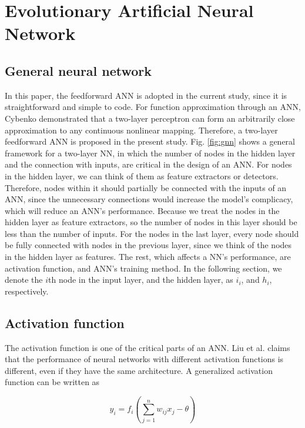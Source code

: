 \section{Evolutionary Artificial Neural Network}

\subsection{General neural network}
In this paper, the feedforward ANN is adopted in the current
study, since it is straightforward and simple to code. For function
approximation through an ANN, Cybenko demonstrated that a two-layer perceptron
can form an arbitrarily close approximation to any continuous nonlinear
mapping\cite{cybenko1989approximation}. Therefore, a two-layer feedforward ANN
is proposed in the present study. Fig. \ref{fig:gnn} shows a general framework for a
two-layer NN, in which the number of nodes in the hidden layer and the
connection with inputs, are critical in the design of an ANN. For nodes in the
hidden layer, we can think of them as feature extractors or detectors.
Therefore, nodes within it should partially be connected with the inputs of an ANN,
since the unnecessary connections would increase the model's complicacy, which
will reduce an ANN’s performance. Because we treat the nodes in the hidden layer
as feature extractors, so the number of nodes in this layer should be less than
the number of inputs. For the nodes in the last layer, every node should be
fully connected with nodes in the previous layer, since we think of the nodes
in the hidden layer as features. The rest, which affects a NN’s performance,
are activation function, and ANN's training method. In the following section, we
denote the $i$th node in the input layer, and the hidden layer, as $i_i$, and $h_i$,
respectively.


\subsection{Activation function}

The activation function is one of the critical parts of an ANN. Liu
\cite{liu1996evolutionary} et al. claims that the performance of neural networks with
different activation functions is different, even if they have the same
architecture.  A generalized activation function can be written as

\begin{equation}
	y_i = f_i(\sum_{j=1}^n{w_{ij}x_j - \theta})
\end{equation}

